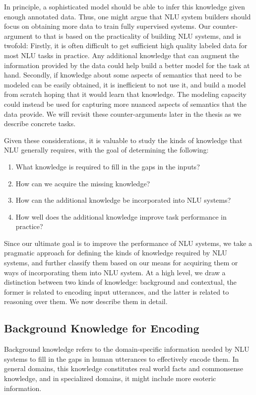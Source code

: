 In principle, a sophisticated model should be able to infer this knowledge given enough annotated
data. Thus, one might argue that NLU system builders should focus on obtaining more data to train
fully supervised systems. Our counter-argument to that is based on the practicality of building NLU
systems, and is twofold: Firstly, it is often difficult to get sufficient high quality labeled data
for most NLU tasks in practice. Any additional knowledge that can augment the information provided
by the data could help build a better model for the task at hand. Secondly, if knowledge about some
aspects of semantics that need to be modeled can be easily obtained, it is inefficient to not use
it, and build a model from scratch hoping that it would learn that knowledge. The modeling capacity
could instead be used for capturing more nuanced aspects of semantics that the data provide. We will
revisit these counter-arguments later in the thesis as we describe concrete tasks.

Given these considerations, it is valuable to study the kinds of knowledge that NLU generally
requires, with the goal of determining the following:
\begin{enumerate}
	\item What knowledge is required to fill in the gaps in the inputs? 
	\item How can we acquire the missing knowledge? 
	\item How can the additional knowledge be incorporated into NLU systems?
	\item How well does the additional knowledge improve task performance in practice?
\end{enumerate}

Since our ultimate goal is to improve the performance of NLU systems, we take a pragmatic approach
for defining the kinds of knowledge required by NLU systems, and further classify them based on our
means for acquiring them or ways of incorporating them into NLU system.  At a high level, we draw a
distinction between two kinds of knowledge: background and contextual, the former is related to
encoding input utterances, and the latter is related to reasoning over them. We now describe them in
detail.

\subsection{Background Knowledge for Encoding} Background knowledge refers to the domain-specific
information needed by NLU systems to fill in the gaps in human utterances to effectively encode
them. In general domains, this knowledge constitutes real world facts and commonsense knowledge, and
in specialized domains, it might include more esoteric information.

